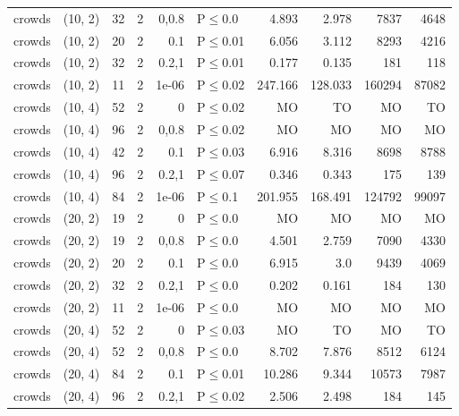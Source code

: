\begin{longtable}{llrrrlrrrr}
 crowds        & (10, 2)  &     	32 &   2 & 0,0.8 & P$\leq$0.0   & 4.893    & 2.978    & 7837    & 4648   \\
 crowds        & (10, 2)  &     	20 &   2 & 0.1   & P$\leq$0.01  & 6.056    & 3.112    & 8293    & 4216   \\
 crowds        & (10, 2)  &     	32 &   2 & 0.2,1 & P$\leq$0.01  & 0.177    & 0.135    & 181     & 118    \\
 crowds        & (10, 2)  &     	11 &   2 & 1e-06 & P$\leq$0.02  & 247.166  & 128.033  & 160294  & 87082  \\
 crowds        & (10, 4)  &     	52 &   2 & 0     & P$\leq$0.02  & MO       & TO       & MO      & TO     \\
 crowds        & (10, 4)  &     	96 &   2 & 0,0.8 & P$\leq$0.02  & MO       & MO       & MO      & MO     \\
 crowds        & (10, 4)  &     	42 &   2 & 0.1   & P$\leq$0.03  & 6.916    & 8.316    & 8698    & 8788   \\
 crowds        & (10, 4)  &     	96 &   2 & 0.2,1 & P$\leq$0.07  & 0.346    & 0.343    & 175     & 139    \\
 crowds        & (10, 4)  &     	84 &   2 & 1e-06 & P$\leq$0.1   & 201.955  & 168.491  & 124792  & 99097  \\
 crowds        & (20, 2)  &     	19 &   2 & 0     & P$\leq$0.0   & MO       & MO       & MO      & MO     \\
 crowds        & (20, 2)  &     	19 &   2 & 0,0.8 & P$\leq$0.0   & 4.501    & 2.759    & 7090    & 4330   \\
 crowds        & (20, 2)  &     	20 &   2 & 0.1   & P$\leq$0.0   & 6.915    & 3.0      & 9439    & 4069   \\
 crowds        & (20, 2)  &     	32 &   2 & 0.2,1 & P$\leq$0.0   & 0.202    & 0.161    & 184     & 130    \\
 crowds        & (20, 2)  &     	11 &   2 & 1e-06 & P$\leq$0.0   & MO       & MO       & MO      & MO     \\
 crowds        & (20, 4)  &     	52 &   2 & 0     & P$\leq$0.03  & MO       & TO       & MO      & TO     \\
 crowds        & (20, 4)  &     	52 &   2 & 0,0.8 & P$\leq$0.0   & 8.702    & 7.876    & 8512    & 6124   \\
 crowds        & (20, 4)  &     	84 &   2 & 0.1   & P$\leq$0.01  & 10.286   & 9.344    & 10573   & 7987   \\
 crowds        & (20, 4)  &     	96 &   2 & 0.2,1 & P$\leq$0.02  & 2.506    & 2.498    & 184     & 145    \\

\end{longtable}
